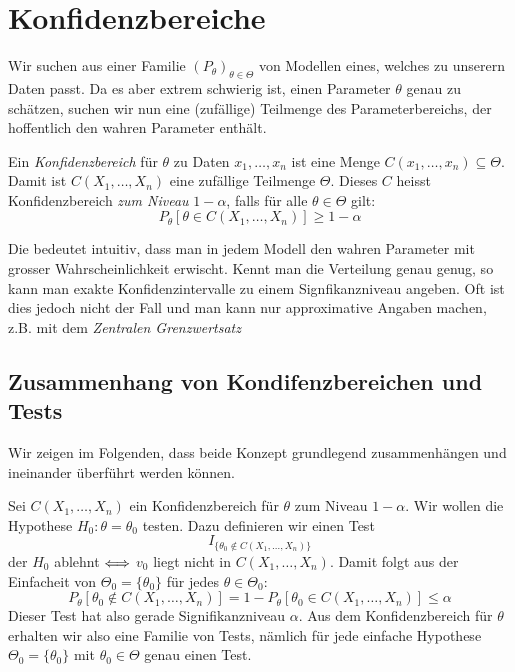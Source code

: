 \section{Konfidenzbereiche}
Wir suchen aus einer Familie $(P_\theta)_{\theta \in \Theta}$ von Modellen eines, welches zu unserern Daten passt. Da es aber extrem schwierig ist, einen Parameter $\theta$ genau zu schätzen, suchen wir nun eine (zufällige) Teilmenge des Parameterbereichs, der hoffentlich den wahren Parameter enthält.

\begin{definition}
Ein \textit{Konfidenzbereich} für $\theta$ zu Daten $x_1, \dots, x_n$ ist eine Menge $C(x_1,\dots, x_n) \subseteq \Theta$. Damit ist $C(X_1,\dots,X_n)$ eine zufällige Teilmenge $\Theta$. Dieses $C$ heisst Konfidenzbereich \textit{zum Niveau} $1-\alpha$, falls für alle $\theta \in \Theta$ gilt:
$$ P_\theta [\theta \in C(X_1,\dots, X_n)] \geq 1-\alpha$$
\end{definition}
Die bedeutet intuitiv, dass man in jedem Modell den wahren Parameter mit grosser Wahrscheinlichkeit erwischt. Kennt man die Verteilung genau genug, so kann man exakte Konfidenzintervalle zu einem Signfikanzniveau angeben. Oft ist dies jedoch nicht der Fall und man kann nur approximative Angaben machen, z.B. mit dem \textit{Zentralen Grenzwertsatz}

\subsection{Zusammenhang von Kondifenzbereichen und Tests}
Wir zeigen im Folgenden, dass beide Konzept grundlegend zusammenhängen und ineinander überführt werden können.\\
\begin{mdframed}
Sei $C(X_1,\dots,X_n)$ ein Konfidenzbereich für $\theta$ zum Niveau $1-\alpha$. Wir wollen die Hypothese $H_0 : \theta = \theta_0$ testen. Dazu definieren wir einen Test 
$$ I_{\{\theta_0 \notin C(X_1,\dots,X_n)\}}$$
der $H_0$ ablehnt $\Longleftrightarrow$ $v_0$ liegt nicht in $C(X_1,\dots, X_n)$. Damit folgt aus der Einfacheit von $\Theta_0 = \{\theta_0\}$ für jedes $\theta \in \Theta_0:$
$$ P_{\theta} [\theta_0 \notin C(X_1,\dots,X_n)] = 1 - P_\theta[\theta_0 \in C(X_1,\dots,X_n)] \leq \alpha$$
Dieser Test hat also gerade Signifikanzniveau $\alpha$. Aus dem Konfidenzbereich für $\theta$ erhalten wir also eine Familie von Tests, nämlich für jede einfache Hypothese $\Theta_0 = \{\theta_0\}$ mit $\theta_0 \in \Theta$ genau einen Test.
\end{mdframed}


